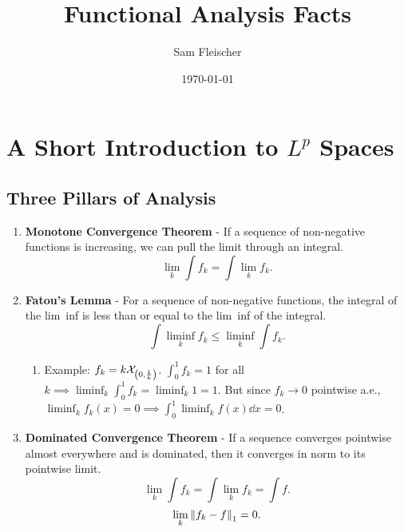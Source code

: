 \documentclass{article}
\title{Functional Analysis Facts}
\author{Sam Fleischer}
\date{\today}
\begin{document}
    \maketitle
    \section{A Short Introduction to $L^p$ Spaces}
    \subsection{Three Pillars of Analysis}
    \begin{enumerate}
        \item
            \textbf{Monotone Convergence Theorem} - If a sequence of non-negative functions is increasing, we can pull the limit through an integral. $$\lim_k \int f_k = \int \lim_k f_k.$$
        \item
            \textbf{Fatou's Lemma} - For a sequence of non-negative functions, the integral of the lim~inf is less than or equal to the lim~inf of the integral. $$\int \liminf_k f_k \leq \liminf_k \int f_k.$$
            \begin{enumerate}
                \item
                    Example: $f_k = k\mathcal{X}_{\qty(0, \frac{1}{k})}$.  $\int_0^1 f_k = 1$ for all $k \implies \liminf_k \int_0^1 f_k = \liminf_k 1 = 1$.  But since $f_k \rightarrow 0$ pointwise a.e., $\liminf_k f_k(x) = 0 \implies \int_0^1 \liminf_k f(x) \dd x = 0$.
            \end{enumerate}
        \item
            \textbf{Dominated Convergence Theorem} - If a sequence converges pointwise almost everywhere and is dominated, then it converges in norm to its pointwise limit.  $$\lim_k\int f_k = \int \lim_k f_k = \int f.$$  $$\lim_k\norm{f_k - f}_1 = 0.$$
    \end{enumerate}
\end{document}
